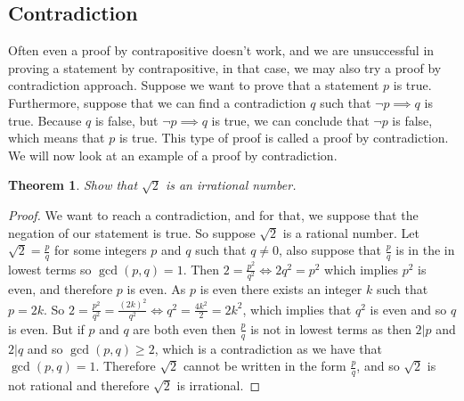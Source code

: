 \documentclass[12pt]{exam}
\newtheorem{theorem}{Theorem}
\begin{document}
\subsection*{Contradiction}
Often even a proof by contrapositive doesn't work, and we are unsuccessful in proving a statement by contrapositive, in that case, we may also try a proof by contradiction approach.
Suppose we want to prove that a statement $p$ is true. 
Furthermore, suppose that we can find a contradiction $q$ such that $\neg p \implies q$ is true. 
Because $q$ is false, but $\neg p \implies q$ is true, we can conclude that $\neg p$ is false, which means that $p$ is true.
This type of proof is called a proof by contradiction.
We will now look at an example of a proof by contradiction.
\begin{theorem}
    Show that $\sqrt{2}$ is an irrational number.
\end{theorem}
\begin{proof}
    We want to reach a contradiction, and for that, we suppose that the negation of our statement is true.
    So suppose $\sqrt{2}$ is a rational number. Let $\sqrt{2} = \frac{p}{q}$ for some integers $p$ and $q$ such that $q \neq 0$, also suppose that $\frac{p}{q}$ is in the in lowest terms so $\gcd(p,q) = 1$.
    Then $2 = \frac{p^2}{q^2} \iff 2q^2 = p^2$ which implies $p^2$ is even, and therefore $p$ is even.
    As $p$ is even there exists an integer $k$ such that $p = 2k$.
    So $2 = \frac{p^2}{q^2} = \frac{(2k)^2}{q^2} \iff q^2 = \frac{4k^2}{2} = 2k^2$, which implies that $q^2$ is even and so $q$ is even. But if $p$ and $q$ are both even then $\frac{p}{q}$ is not in lowest terms as then $2 | p$ and $2|q$ and so $\gcd(p,q) \geq 2$, which is a contradiction as we have that $\gcd(p,q) = 1$.
    Therefore $\sqrt{2}$ cannot be written in the form $\frac{p}{q}$, and so $\sqrt{2}$ is not rational and therefore $\sqrt{2}$ is irrational.
\end{proof}
\end{document}
